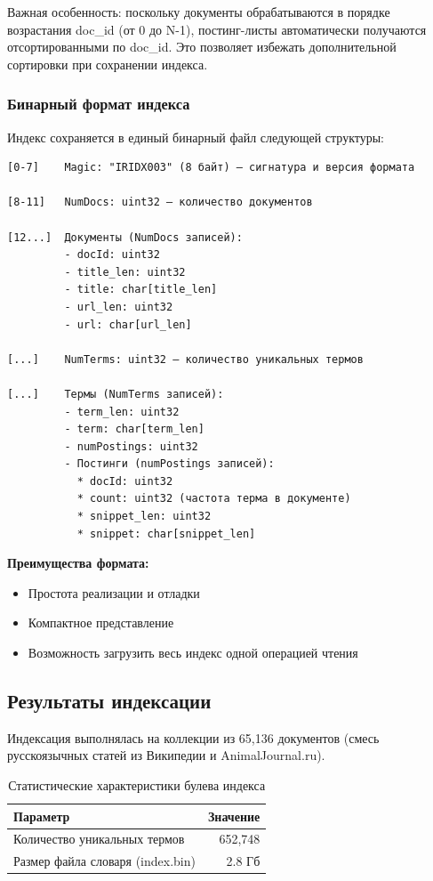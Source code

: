 \documentclass[a4paper,12pt]{article}
\begin{document}
Важная особенность: поскольку документы обрабатываются в порядке возрастания doc\_id (от 0 до N-1), постинг-листы автоматически получаются отсортированными по doc\_id. Это позволяет избежать дополнительной сортировки при сохранении индекса.

\subsubsection{Бинарный формат индекса}

Индекс сохраняется в единый бинарный файл следующей структуры:

\begin{verbatim}
[0-7]    Magic: "IRIDX003" (8 байт) — сигнатура и версия формата

[8-11]   NumDocs: uint32 — количество документов

[12...]  Документы (NumDocs записей):
         - docId: uint32
         - title_len: uint32
         - title: char[title_len]
         - url_len: uint32
         - url: char[url_len]

[...]    NumTerms: uint32 — количество уникальных термов

[...]    Термы (NumTerms записей):
         - term_len: uint32
         - term: char[term_len]
         - numPostings: uint32
         - Постинги (numPostings записей):
           * docId: uint32
           * count: uint32 (частота терма в документе)
           * snippet_len: uint32
           * snippet: char[snippet_len]
\end{verbatim}

\textbf{Преимущества формата:}
\begin{itemize}
    \item Простота реализации и отладки
    \item Компактное представление
    \item Возможность загрузить весь индекс одной операцией чтения
\end{itemize}
\subsection{Результаты индексации}

Индексация выполнялась на коллекции из 65,136 документов (смесь русскоязычных статей из Википедии и AnimalJournal.ru).

\begin{table}[H]
\centering
\begin{tabular}{|l|r|}
\hline
\textbf{Параметр} & \textbf{Значение} \\
\hline
Количество уникальных термов & 652,748 \\
\hline
Размер файла словаря (index.bin) & 2.8 Гб \\
\hline
\end{tabular}
\caption{Статистические характеристики булева индекса}
\end{table}
\end{document}
